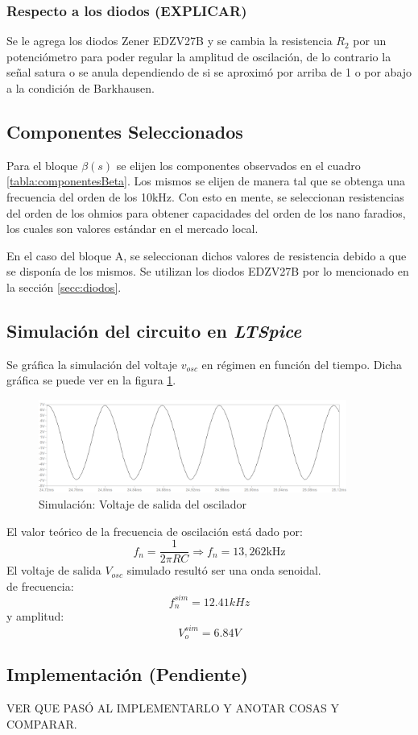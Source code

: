 \subsubsection{Respecto a los diodos (EXPLICAR)}
{\color{red}  Se le agrega los diodos Zener EDZV27B y se cambia la resistencia $R_{2}$ por un potenciómetro para poder regular la amplitud de oscilación, de lo contrario la señal satura o se anula dependiendo de si se aproximó por arriba de 1 o por abajo  a la condición de Barkhausen.}\\
\label{secc:diodos}
\subsection{Componentes Seleccionados}


Para el bloque $\beta(s)$ se elijen los componentes observados en el cuadro \ref{tabla:componentesBeta}. Los mismos se elijen de manera tal que se obtenga una frecuencia del orden de los 10kHz. Con esto en mente, se seleccionan resistencias del orden de los ohmios para obtener capacidades del orden de los nano faradios, los cuales son valores estándar en el mercado local.



En el caso del bloque A, se seleccionan dichos valores de resistencia debido a que se disponía de los mismos. Se utilizan los diodos EDZV27B por lo mencionado en la sección \ref{secc:diodos}.


\subsection{Simulación del circuito en \emph{LTSpice}}

 Se gráfica la simulación del voltaje $v_{osc}$  en régimen en función del tiempo. Dicha gráfica se puede ver en la figura \ref{sim:Vosc}. 

\begin{figure}[H]
	\centering
	\includegraphics[width=0.9\textwidth]{Oscilador/salida_simulada.png}
	\caption{Simulación: Voltaje de salida del oscilador}
	\label{sim:Vosc}
\end{figure}
El valor teórico de la frecuencia de oscilación está dado por: 
$$f_n=\frac{1}{2\pi RC}\Longrightarrow f_n = 13,262 \si{\kHz}$$
El voltaje de salida $V_{osc}$ simulado resultó ser una onda senoidal.\\
de frecuencia:
$$f_n^{sim}=12.41 kHz$$
y amplitud:
$$V_o^{sim} =  6.84 V$$
\subsection{Implementación (Pendiente)}
VER QUE PASÓ AL IMPLEMENTARLO Y ANOTAR COSAS Y COMPARAR.





